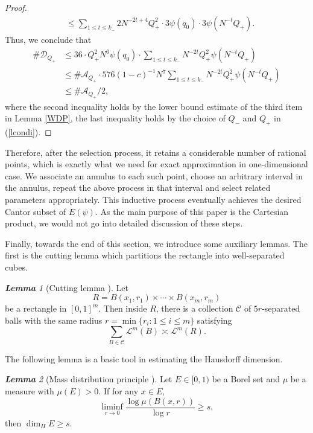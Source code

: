 \documentclass[11pt]{amsart}
\numberwithin{equation}{section}
\newcommand{\0}{\mathbf{0}}
\theoremstyle{remark}
\newtheorem{lem}{\bf Lemma}[section]
\newcommand{\dimH}{\dim_{H}}
\begin{document}
{\begin{proof}
\begin{align*}
         &\le \sum_{1\le t\le k_-}{2N^{-2t+4}Q_+^2}\cdot3\psi(q_0)\cdot3\psi(N^{-t}Q_+).
    \end{align*}
    Thus, we conclude that
    \begin{align*}
    \#\mathcal{D}_{Q_+}&\le{36 \cdot Q_+^2 N^6}\psi(q_0)\cdot\sum_{1\le t\le k_-}N^{-2t}Q_+^2\psi(N^{-t}Q_+)\\
    &\le\#\mathcal{A}_{Q_+}\cdot 576(1-c)^{-1}N^7\sum_{1\le t\le k_-}N^{-2t}Q_+^2\psi(N^{-t}Q_+)\\
    &\le \#\mathcal{A}_{Q_+}/2,
    \end{align*}
    where the second inequality holds by the lower bound estimate of the third item in Lemma \ref{WDP}, the last inequality holds by the choice of $Q_-$ and $Q_+$ in (\ref{lcondi}).
\end{proof}

Therefore, after the selection process,  it retains a considerable number of rational points, which is exactly what we need for exact approximation in one-dimensional case. We associate an annulus to each such point, choose an arbitrary interval in the annulus, repeat the above process in that interval and select related parameters appropriately. This inductive process eventually achieves the desired Cantor subset of $E(\psi)$. As the main purpose of this paper is the Cartesian product, we would not go into detailed discussion of these steps.

Finally, towards the end of this section, we introduce some auxiliary lemmas. The first is the cutting lemma which partitions the rectangle into well-separated cubes.
\begin{lem}[Cutting lemma \cite{WangWuTAMS}]\label{cut}
    Let $$R=B(x_1,r_1)\times \cdots\times B(x_m,r_m)$$
    be a rectangle in $[0,1]^m$. Then inside $R$, there is a collection $\mathcal{C}$ of $5r$-separated balls
    with the same radius $r=\min\{r_i:1\le i\le m\}$ satisfying
    $$\sum_{B\in\mathcal{C}}\mathcal{L}^m(B)\asymp\mathcal{L}^m(R).$$
\end{lem}
The following lemma is a basic tool in estimating the Hausdorff dimension. 
\begin{lem}[Mass distribution principle \cite{Falconer_book2013}]\label{MDP}
Let $E\in[0,1)$ be a Borel set and $\mu$ be a measure with $\mu(E)>0$. If for any $x\in E$,
$$\liminf_{r\rightarrow 0}\frac{\log \mu(B(x,r))}{\log r}\ge s,$$
then $\dimH E\ge s$.
\end{lem}

}
\end{document}
